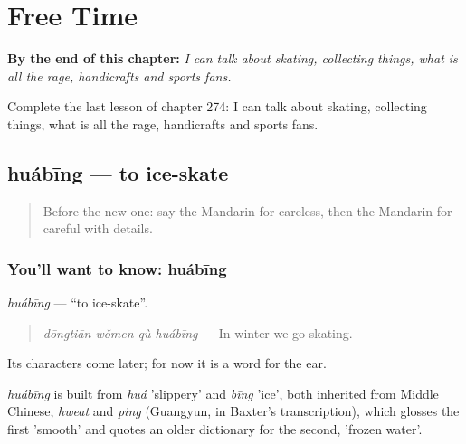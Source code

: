 
\chapter{Free Time}
\label{ch:zh-free-time}

\begin{chapteropening}
\textbf{By the end of this chapter:} \emph{I can talk about skating, collecting things, what is all the rage, handicrafts and sports fans.}

Complete the last lesson of chapter 274: I can talk about skating, collecting things, what is all the rage, handicrafts and sports fans.
\end{chapteropening}

\section[huábīng]{huábīng — to ice-skate}

\label{lesson:ZH-C274-huabing}



\begin{quote}
Before the new one: say the Mandarin for careless, then the Mandarin for careful with details.
\end{quote}

\subsection*{You'll want to know: huábīng}
\emph{huábīng} — \textquotedblleft{}to ice-skate\textquotedblright{}.

\begin{quote}
\emph{dōngtiān wǒmen qù huábīng} — In winter we go skating.
\end{quote}

Its characters come later; for now it is a word for the ear.

\begin{cousinweb}
\emph{huábīng} is built from \emph{huá} 'slippery' and \emph{bīng} 'ice', both inherited from Middle Chinese, \emph{hweat} and \emph{ping} (Guangyun, in Baxter's transcription), which glosses the first 'smooth' and quotes an older dictionary for the second, 'frozen water'.
\end{cousinweb}


